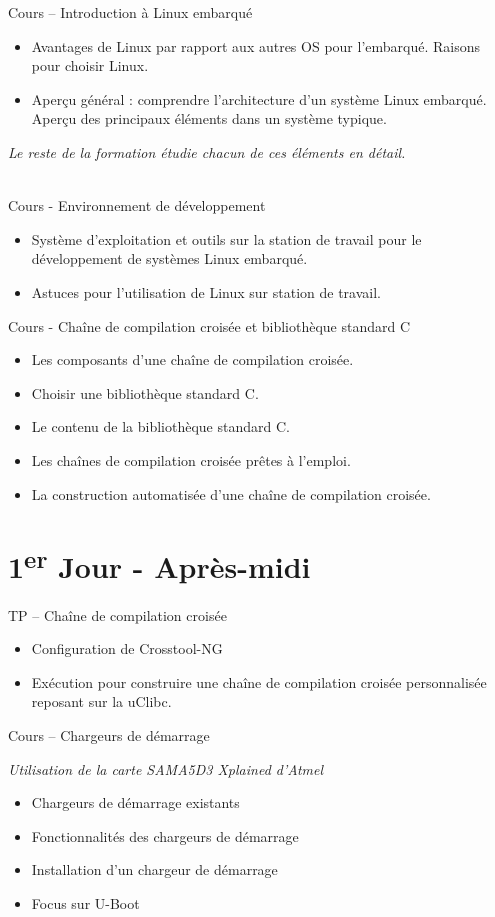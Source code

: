 \documentclass[a4paper,12pt,obeyspaces,spaces,hyphens]{article}
\begin{document}
\feagendaonecolumn
{Cours – Introduction à Linux embarqué}
{
  \begin{itemize}
  \item Avantages de Linux par rapport aux autres OS pour l'embarqué.
	Raisons pour choisir Linux.
  \item Aperçu général : comprendre l'architecture d'un système Linux
	embarqué. Aperçu des principaux éléments dans un système typique.
  \end{itemize}
  {\em Le reste de la formation étudie chacun de ces éléments en détail.}
}
\\
\feagendatwocolumn
{Cours - Environnement de développement}
{
  \begin{itemize}
  \item Système d'exploitation et outils sur la station de travail
	pour le développement de systèmes Linux embarqué.
  \item Astuces pour l'utilisation de Linux sur station de travail.
  \end{itemize}
}
{Cours - Chaîne de compilation croisée et bibliothèque standard C}
{
  \begin{itemize}
  \item Les composants d'une chaîne de compilation croisée.
  \item Choisir une bibliothèque standard C.
  \item Le contenu de la bibliothèque standard C.
  \item Les chaînes de compilation croisée prêtes à l'emploi.
  \item La construction automatisée d'une chaîne de compilation croisée.
  \end{itemize}
}

\section{1\textsuperscript{er} Jour - Après-midi}
\feagendatwocolumn
{TP – Chaîne de compilation croisée}
{
  \begin{itemize}
  \item Configuration de Crosstool-NG
  \item Exécution pour construire une chaîne de compilation croisée
	personnalisée reposant sur la uClibc.
  \end{itemize}
}
{Cours – Chargeurs de démarrage}
{
  {\em Utilisation de la carte SAMA5D3 Xplained d'Atmel}
  \begin{itemize}
  \item Chargeurs de démarrage existants
  \item Fonctionnalités des chargeurs de démarrage
  \item Installation d'un chargeur de démarrage
  \item Focus sur U-Boot
  \end{itemize}
}
\\
\end{document}
